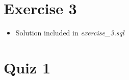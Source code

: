 \documentclass[12pt]{article}
\begin{document}
\bigskip

\section{Exercise 3}

\bigskip

\begin{itemize}
    \item Solution included in \textit{exercise\_3.sql}
\end{itemize}


\bigskip

\section{Quiz 1}

\bigskip
\end{document}
